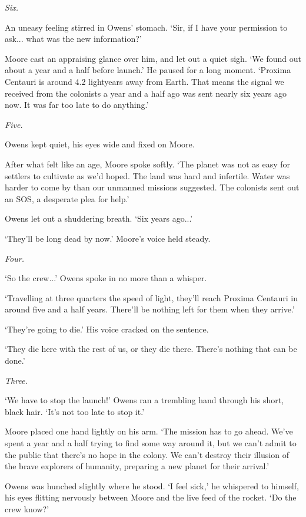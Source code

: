 {\it Six.}

An uneasy feeling stirred in Owens' stomach. `Sir, if I have your permission to ask... what was the new information?'

Moore cast an appraising glance over him, and let out a quiet sigh. `We found out about a year and a half before launch.' He paused for a long moment. `Proxima Centauri is around 4.2 lightyears away from Earth. That means the signal we received from the colonists a year and a half ago was sent nearly six years ago now. It was far too late to do anything.'

{\it Five.}

Owens kept quiet, his eyes wide and fixed on Moore.

After what felt like an age, Moore spoke softly. `The planet was not as easy for settlers to cultivate as we'd hoped. The land was hard and infertile. Water was harder to come by than our unmanned missions suggested. The colonists sent out an SOS, a desperate plea for help.'

Owens let out a shuddering breath. `Six years ago...'

`They'll be long dead by now.' Moore's voice held steady.

{\it Four.}

`So the crew...' Owens spoke in no more than a whisper.

`Travelling at three quarters the speed of light, they'll reach Proxima Centauri in around five and a half years. There'll be nothing left for them when they arrive.'

`They're going to die.' His voice cracked on the sentence.

`They die here with the rest of us, or they die there. There's nothing that can be done.'

{\it Three.}

`We have to stop the launch!' Owens ran a trembling hand through his short, black hair. `It's not too late to stop it.'

Moore placed one hand lightly on his arm. `The mission has to go ahead. We've spent a year and a half trying to find some way around it, but we can't admit to the public that there's no hope in the colony. We can't destroy their illusion of the brave explorers of humanity, preparing a new planet for their arrival.'

Owens was hunched slightly where he stood. `I feel sick,' he whispered to himself, his eyes flitting nervously between Moore and the live feed of the rocket. `Do the crew know?'

